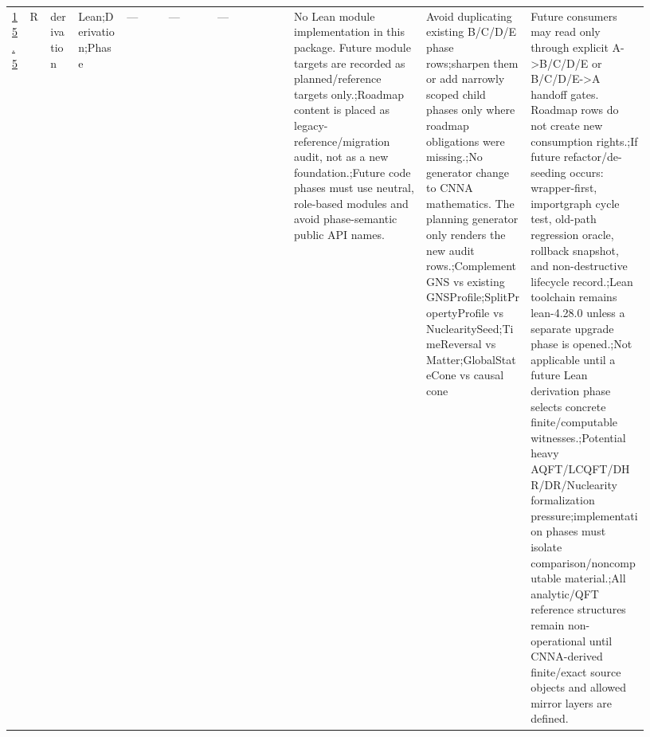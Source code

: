 \begin{longtable}{L{0.026\linewidth} L{0.024\linewidth} L{0.045\linewidth} L{0.07\linewidth} L{0.065\linewidth} L{0.075\linewidth} L{0.11\linewidth} L{0.19\linewidth} L{0.155\linewidth} L{0.17\linewidth}}
\hline
\addlinespace[0.24em]
\hyperlink{phase-row-15-5}{15.5} & R & derivation & Lean;\newline Derivation;\newline Phase & --- & --- & --- & No Lean module implementation in this package. Future module targets are recorded as planned/\allowbreak{}reference targets only.;\newline Roadmap content is placed as legacy-reference/\allowbreak{}migration audit, not as a new foundation.;\newline Future code phases must use neutral, role-based modules and avoid phase-semantic public API names. & Avoid duplicating existing B/\allowbreak{}C/\allowbreak{}D/\allowbreak{}E phase rows;\newline sharpen them or add narrowly scoped child phases only where roadmap obligations were missing.;\newline No generator change to CNNA mathematics. The planning generator only renders the new audit rows.;\newline ComplementGNS vs existing GNSProfile;\newline SplitPropertyProfile vs NuclearitySeed;\newline TimeReversal vs Matter;\newline GlobalStateCone vs causal cone & Future consumers may read only through explicit A->B/\allowbreak{}C/\allowbreak{}D/\allowbreak{}E or B/\allowbreak{}C/\allowbreak{}D/\allowbreak{}E->A handoff gates. Roadmap rows do not create new consumption rights.;\newline If future refactor/\allowbreak{}de-seeding occurs: wrapper-first, importgraph cycle test, old-path regression oracle, rollback snapshot, and non-destructive lifecycle record.;\newline Lean toolchain remains lean-4.28.0 unless a separate upgrade phase is opened.;\newline Not applicable until a future Lean derivation phase selects concrete finite/\allowbreak{}computable witnesses.;\newline Potential heavy AQFT/\allowbreak{}LCQFT/\allowbreak{}DHR/\allowbreak{}DR/\allowbreak{}Nuclearity formalization pressure;\newline implementation phases must isolate comparison/\allowbreak{}noncomputable material.;\newline All analytic/\allowbreak{}QFT reference structures remain non-operational until CNNA-derived finite/\allowbreak{}exact source objects and allowed mirror layers are defined.\\

\end{longtable}
